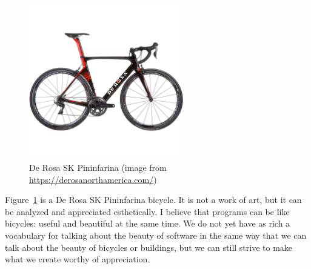 \documentclass[10pt,letterpaper]{article}
\begin{document}
\begin{figure}
  \centering
  \includegraphics[width=0.6\textwidth]{derosa.jpg}
  \caption{De Rosa SK Pininfarina (image from \url{https://derosanorthamerica.com/})}
  \label{bicycle}
\end{figure}

Figure~\ref{bicycle} is a De Rosa SK Pininfarina bicycle.
It is not a work of art,
but it can be analyzed and appreciated esthetically.
I believe that programs can be like bicycles:
useful and beautiful at the same time.
We do not yet have as rich a vocabulary for talking about the beauty of software
in the same way that we can talk about the beauty of bicycles or buildings,
but we can still strive to make what we create worthy of appreciation.


\end{document}

